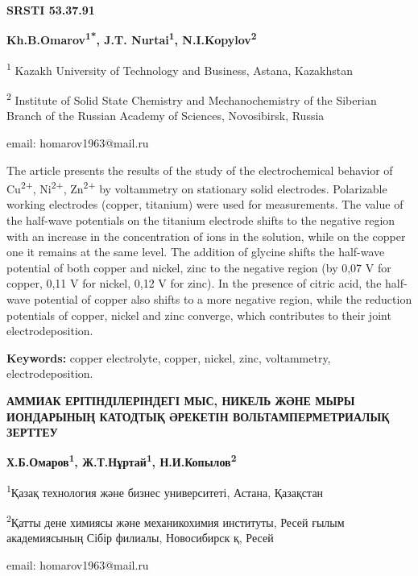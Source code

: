 \clearpage
{\bfseries SRSTI 53.37.91}


\begin{center}
{\bfseries Kh.B.Omarov\textsuperscript{1*}, J.T. Nurtai\textsuperscript{1},
N.I.Kopylov\textsuperscript{2}}

\textsuperscript{1} Kazakh University of Technology and Business,
Astana, Kazakhstan

\textsuperscript{2} Institute of Solid State Chemistry and
Mechanochemistry of the Siberian Branch of the Russian Academy of
Sciences, Novosibirsk, Russia

email: homarov1963@mail.ru
\end{center}

The article presents the results of the study of the electrochemical
behavior of Cu\textsuperscript{2+}, Ni\textsuperscript{2+},
Zn\textsuperscript{2+} by voltammetry on stationary solid electrodes.
Polarizable working electrodes (copper, titanium) were used for
measurements. The value of the half-wave potentials on the titanium
electrode shifts to the negative region with an increase in the
concentration of ions in the solution, while on the copper one it
remains at the same level. The addition of glycine shifts the half-wave
potential of both copper and nickel, zinc to the negative region (by
0,07 V for copper, 0,11 V for nickel, 0,12 V for zinc). In the presence
of citric acid, the half-wave potential of copper also shifts to a more
negative region, while the reduction potentials of copper, nickel and
zinc converge, which contributes to their joint electrodeposition.

{\bfseries Keywords:} copper electrolyte, copper, nickel, zinc,
voltammetry, electrodeposition.

\begin{center}
{\large\bfseries АММИАК ЕРІТІНДІЛЕРІНДЕГІ МЫС, НИКЕЛЬ ЖӘНЕ МЫРЫ ИОНДАРЫНЫҢ КАТОДТЫҚ ӘРЕКЕТІН ВОЛЬТАМПЕРМЕТРИАЛЫҚ ЗЕРТТЕУ}

\vspace{1em}
{\bfseries Х.Б.Омаров\textsuperscript{1}, Ж.Т.Нұртай\textsuperscript{1},
Н.И.Копылов\textsuperscript{2}}

\textsuperscript{1}Қазақ технология және бизнес университеті, Астана,
Қазақстан

\textsuperscript{2}Қатты дене химиясы және механикохимия институты,
Ресей ғылым академиясының Сібір филиалы, Новосибирск қ, Ресей

email: homarov1963@mail.ru
\end{center}

